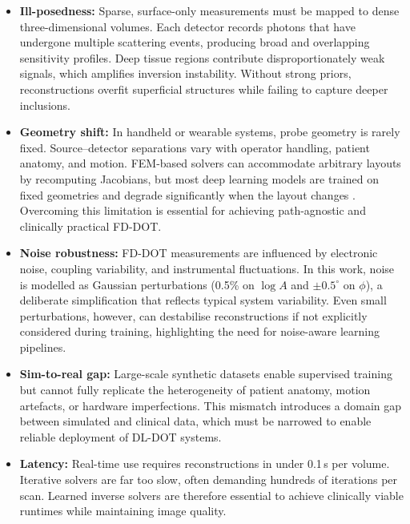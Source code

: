 \begin{itemize}
    \item \textbf{Ill-posedness:} Sparse, surface-only measurements must be mapped to dense three-dimensional volumes. Each detector records photons that have undergone multiple scattering events, producing broad and overlapping sensitivity profiles. Deep tissue regions contribute disproportionately weak signals, which amplifies inversion instability. Without strong priors, reconstructions overfit superficial structures while failing to capture deeper inclusions.
    
    \item \textbf{Geometry shift:} In handheld or wearable systems, probe geometry is rarely fixed. Source–detector separations vary with operator handling, patient anatomy, and motion. FEM-based solvers can accommodate arbitrary layouts by recomputing Jacobians, but most deep learning models are trained on fixed geometries and degrade significantly when the layout changes \cite{dale2025}. Overcoming this limitation is essential for achieving path-agnostic and clinically practical FD-DOT.
    
    \item \textbf{Noise robustness:} FD-DOT measurements are influenced by electronic noise, coupling variability, and instrumental fluctuations. In this work, noise is modelled as Gaussian perturbations (0.5\% on $\log A$ and $\pm 0.5^\circ$ on $\phi$), a deliberate simplification that reflects typical system variability. Even small perturbations, however, can destabilise reconstructions if not explicitly considered during training, highlighting the need for noise-aware learning pipelines.
    
    \item \textbf{Sim-to-real gap:} Large-scale synthetic datasets enable supervised training but cannot fully replicate the heterogeneity of patient anatomy, motion artefacts, or hardware imperfections. This mismatch introduces a domain gap between simulated and clinical data, which must be narrowed to enable reliable deployment of DL-DOT systems.
    
    \item \textbf{Latency:} Real-time use requires reconstructions in under 0.1\,s per volume. Iterative solvers are far too slow, often demanding hundreds of iterations per scan. Learned inverse solvers are therefore essential to achieve clinically viable runtimes while maintaining image quality.
\end{itemize}



